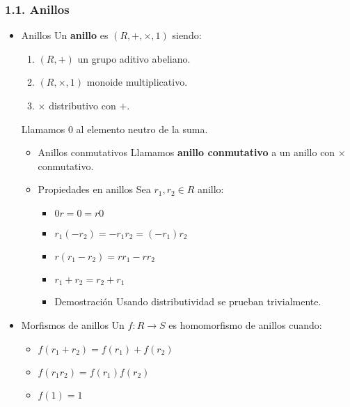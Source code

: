 \documentclass[11pt]{article}
\begin{document}
\subsubsection*{1.1. Anillos}
\label{sec-7-1-1}
\begin{itemize}
\item Anillos
\label{sec-7-1-1-1}
Un \textbf{anillo} es $(R,+,\times,1)$ siendo:

\begin{enumerate}
\item $(R,+)$ un grupo aditivo abeliano.
\item $(R,\times,1)$ monoide multiplicativo.
\item $\times$ distributivo con $+$.
\end{enumerate}

Llamamos $0$ al elemento neutro de la suma.

\begin{itemize}
\item Anillos conmutativos
\label{sec-7-1-1-1-1}
Llamamos \textbf{anillo conmutativo} a un anillo con $\times$ conmutativo.

\item Propiedades en anillos
\label{sec-7-1-1-1-2}
Sea $r_1,r_2 \in R$ anillo:

\begin{itemize}
\item $0r=0=r0$
\item $r_1(-r_2) = -r_1r_2 = (-r_1)r_2$
\item $r(r_1-r_2) = rr_1-rr_2$
\item $r_1+r_2=r_2+r_1$
\end{itemize}

\begin{itemize}
\item Demostración
\label{sec-7-1-1-1-2-1}
Usando distributividad se prueban trivialmente.
\end{itemize}
\end{itemize}

\item Morfismos de anillos
\label{sec-7-1-1-2}
Un $f : R \to S$ es homomorfismo de anillos cuando:

\begin{itemize}
\item $f(r_1+r_2) = f(r_1)+f(r_2)$
\item $f(r_1r_2) = f(r_1)f(r_2)$
\item $f(1) = 1$
\end{itemize}


\end{itemize}
\end{document}
